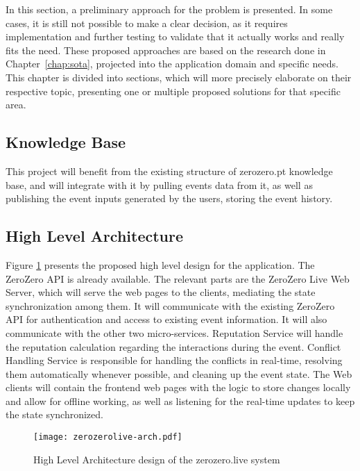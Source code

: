 In this section, a preliminary approach for the problem is presented. In some cases, it is still not possible to make a clear decision, as it requires implementation and further testing to validate that it actually works and really fits the need. These proposed approaches are based on the research done in Chapter~\ref{chap:sota}, projected into the application domain and specific needs. This chapter is divided into sections, which will more precisely elaborate on their respective topic, presenting one or multiple proposed solutions for that specific area. 

\subsection{Knowledge Base}
This project will benefit from the existing structure of zerozero.pt knowledge base, and will integrate with it by pulling events data from it, as well as publishing the event inputs generated by the users, storing the event history.

\subsection{High Level Architecture}

Figure \ref{fig:high-level-arch} presents the proposed high level design for the application. The ZeroZero API is already available. The relevant parts are the ZeroZero Live Web Server, which will serve the web pages to the clients, mediating the state synchronization among them. It will communicate with the existing ZeroZero API for authentication and access to existing event information. It will also communicate with the other two micro-services. Reputation Service will handle the reputation calculation regarding the interactions during the event. Conflict Handling Service is responsible for handling the conflicts in real-time, resolving them automatically whenever possible, and cleaning up the event state. The Web clients will contain the frontend web pages with the logic to store changes locally and allow for offline working, as well as listening for the real-time updates to keep the state synchronized.

\begin{figure}[t]
    \begin{center}
        \leavevmode
        \texttt{[image: zerozerolive-arch.pdf]}
        \caption{High Level Architecture design of the zerozero.live system}
        \label{fig:high-level-arch}
    \end{center}
\end{figure}

